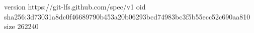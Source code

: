 version https://git-lfs.github.com/spec/v1
oid sha256:3d73031a8dc0f46689790b453a20b06293bcd74983bc3f5b55ecc52c690aa810
size 262240
